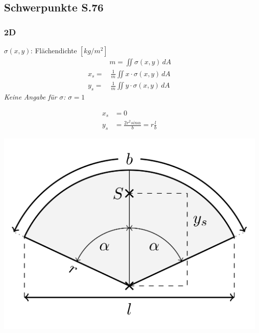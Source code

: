 \subsection{Schwerpunkte \texorpdfstring{\hfill S.76}{S.76}}\vspace{3pt}

    \subsubsection{2D}
    $\sigma(x,y)$: Flächendichte $[kg/m^2 ] $
        \begin{align*}
            &m = \iint \sigma(x,y) \, dA\\[0.25em]
            x_s =&\, \frac{1}{m} \iint x \cdot \sigma(x,y) \, dA\\
            y_s =&\, \frac{1}{m} \iint y \cdot \sigma(x,y) \, dA
        \end{align*}
    \textit{Keine Angabe für $\sigma$: $\sigma = 1$}
    \vspace{5pt}
    \begin{minipage}{0.49\linewidth}
        \begin{align*}
        x_s &= 0 \\
        y_s &= \frac{2r^2 sin \alpha}{b} = r \frac{l}{b}
        \end{align*}
    \end{minipage}
    \begin{minipage}{0.49\linewidth}
        \includegraphics[width=0.95\linewidth]{src/Mehrdimensionale-Funktionen_Integralrechnung/1024px-Circular-sector-centroid.svg.png}
    \end{minipage}
    
